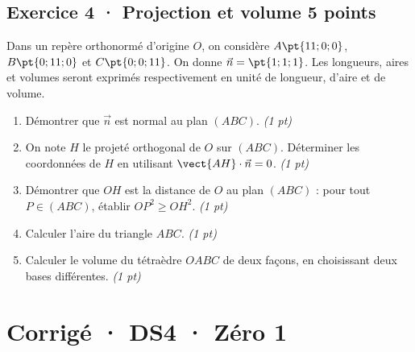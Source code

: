 \subsection*{Exercice 4 · Projection et volume \hfill 5 points}Dans un repère orthonormé d'origine $O$, on considère $A\pt{11;0;0}$, $B\pt{0;11;0}$ et $C\pt{0;0;11}$. On donne $\vec n=\pt{1;1;1}$. Les longueurs, aires et volumes seront exprimés respectivement en unité de longueur, d'aire et de volume.

\begin{enumerate}

\item Démontrer que $\vec n$ est normal au plan $(ABC)$. \hfill\textit{(1 pt)}

\item On note $H$ le projeté orthogonal de $O$ sur $(ABC)$. Déterminer les coordonnées de $H$ en utilisant $\vect{AH}\cdot\vec n=0$. \hfill\textit{(1 pt)}

\item Démontrer que $OH$ est la distance de $O$ au plan $(ABC)$ : pour tout $P\in(ABC)$, établir $OP^2\ge OH^2$. \hfill\textit{(1 pt)}

\item Calculer l'aire du triangle $ABC$. \hfill\textit{(1 pt)}

\item Calculer le volume du tétraèdre $OABC$ de deux façons, en choisissant deux bases différentes. \hfill\textit{(1 pt)}

\end{enumerate}

\ifmxteacher\mxnewpage

\section*{Corrigé · DS4 · Zéro 1}\label{cor:6-1}

